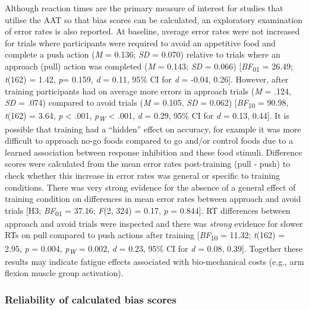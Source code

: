 \documentclass[man,floatsintext]{apa6}
\begin{document}
Although reaction times are the primary measure of interest for studies that utilise the AAT so that bias scores can be calculated, an exploratory examination of error rates is also reported. At baseline, average error rates were not increased for trials where participants were required to avoid an appetitive food and complete a push action (\emph{M} = 0.136; \emph{SD} = 0.070) relative to trials where an approach (pull) action was completed (\emph{M} = 0.143; \emph{SD} = 0.066) {[}\textit{BF}\textsubscript{01} = 26.49; \textit{t}(162) = 1.42, \textit{p}= 0.159, \textit{d} = 0.11, 95\% CI for \textit{d} = -0.04, 0.26{]}. However, after training participants had on average more errors in approach trials (\emph{M} = .124, \emph{SD} = .074) compared to avoid trials (\emph{M} = 0.105, \emph{SD} = 0.062) {[}\textit{BF}\textsubscript{10} = 90.98, \textit{t}(162) = 3.64, \textit{p} \textless{} .001, \textit{p\textsubscript{W}} \textless{} .001, \textit{d} = 0.29, 95\% CI for \textit{d} = 0.13, 0.44{]}. It is possible that training had a \enquote{hidden} effect on accuracy, for example it was more difficult to approach no-go foods compared to go and/or control foods due to a learned association between response inhibition and these food stimuli. Difference scores were calculated from the mean error rates post-training (pull - push) to check whether this increase in error rates was general or specific to training conditions. There was very strong evidence for the absence of a general effect of training condition on differences in mean error rates between approach and avoid trials {[}H3; \emph{BF}\textsubscript{01} = 37.16; \emph{F}(2, 324) = 0.17, \emph{p} = 0.844{]}. RT differences between approach and avoid trials were inspected and there was \emph{strong} evidence for slower RTs on pull compared to push actions after training {[}\emph{BF}\textsubscript{10} = 11.32; \emph{t}(162) = 2.95, \emph{p} = 0.004, \textit{p\textsubscript{W}} = 0.002, \emph{d} = 0.23, 95\% CI for \emph{d} = 0.08, 0.39{]}. Together these results may indicate fatigue effects associated with bio-mechanical costs (e.g., arm flexion muscle group activation).

\hypertarget{reliability}{%
\subsubsection{Reliability of calculated bias scores}\label{reliability}}
\end{document}
